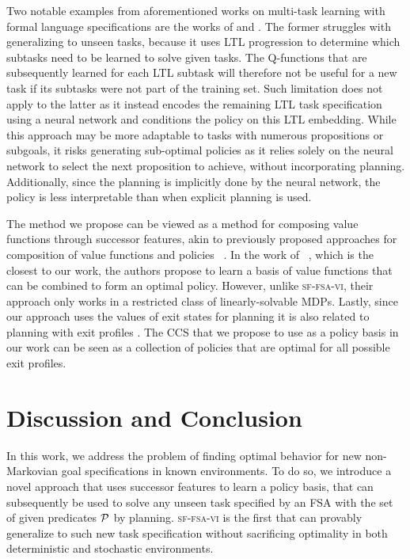 Two notable examples from aforementioned works on multi-task learning with formal language specifications are the works of \citep{Icarte2018b} and \citep{Vaezipoor2021}. The former struggles with generalizing to unseen tasks, because it uses LTL progression to determine which subtasks need to be learned to solve given tasks. The Q-functions that are subsequently learned for each LTL subtask will therefore not be useful for a new task if its subtasks were not part of the training set. Such limitation does not apply to the latter as it instead encodes the remaining LTL task specification using a neural network and conditions the policy on this LTL embedding. While this approach may be more adaptable to tasks with numerous propositions or subgoals, it risks generating sub-optimal policies as it relies solely on the neural network to select the next proposition to achieve, without incorporating planning. Additionally, since the planning is implicitly done by the neural network, the policy is less interpretable than when explicit planning is used.

The method we propose can be viewed as a method for composing value functions through successor features, akin to previously proposed approaches for composition of value functions and policies ~\citep{Niekerk2019, Barreto2019, NangueTasse2020, Infante2022}. In the work of ~\citep{Infante2022}, which is the closest to our work, the authors propose to learn a basis of value functions that can be combined to form an optimal policy. However, unlike \textsc{sf-fsa-vi}, their approach only works in a restricted class of linearly-solvable MDPs. Lastly, since our approach uses the values of exit states for planning it is also related to planning with exit profiles \citep{Wen2020}. The CCS that we propose to use as a policy basis in our work can be seen as a collection of policies that are optimal for all possible exit profiles.

\section{Discussion and Conclusion}

In this work, we address the problem of finding optimal behavior for new non-Markovian goal specifications in known environments. To do so, we introduce a novel approach that uses successor features to learn a policy basis, that can subsequently be used to solve any unseen task specified by an FSA with the set of given predicates $\mathcal{P}$ by planning. \textsc{sf-fsa-vi} is the first that can provably generalize to such new task specification without sacrificing optimality in both deterministic and stochastic environments.

